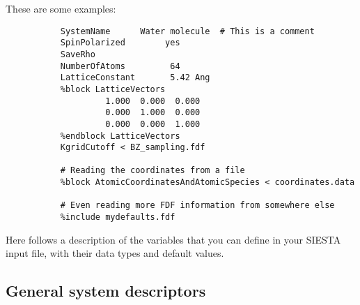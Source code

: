 \noindent
These are some examples:


\begin{verbatim}
           SystemName      Water molecule  # This is a comment 
           SpinPolarized        yes 
           SaveRho                 
           NumberOfAtoms         64  
           LatticeConstant       5.42 Ang  
           %block LatticeVectors  
                    1.000  0.000  0.000 
                    0.000  1.000  0.000 
                    0.000  0.000  1.000
           %endblock LatticeVectors  
           KgridCutoff < BZ_sampling.fdf 

           # Reading the coordinates from a file 
           %block AtomicCoordinatesAndAtomicSpecies < coordinates.data 

           # Even reading more FDF information from somewhere else
           %include mydefaults.fdf  
\end{verbatim}

Here follows a description of the variables that you can
define in your SIESTA input file, with their data types and
default values.

\vspace{5pt}
\subsection{General system descriptors}

